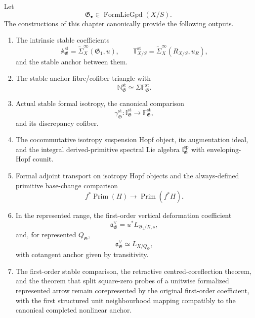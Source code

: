 \begin{theorem}
\label{thm:bnla-differentiation-package}
Let
\[
    \mathfrak G_\bullet
    \in
    \operatorname{FormLieGpd}(X/S).
\]
The constructions of this chapter canonically provide the following outputs.
\begin{enumerate}
    \item The intrinsic stable coefficients
    \[
        \mathbb A^{\mathrm{st}}_{\mathfrak G}
        =\widetilde\Sigma^\infty_X(\mathfrak G_1,u),
        \qquad
        \mathbb T^{\mathrm{st}}_{X/S}
        =\widetilde\Sigma^\infty_X(R_{X/S},u_R),
    \]
    and the stable anchor between them.

    \item The stable anchor fibre/cofiber triangle with
    \[
        \mathbb N^{\mathrm{st}}_{\mathfrak G}
        \simeq
        \Sigma\mathbb F^{\mathrm{st}}_{\mathfrak G}.
    \]

    \item Actual stable formal isotropy, the canonical comparison
    \[
        \gamma^{\mathrm{st}}_{\mathfrak G}:
        \mathbb I^{\mathrm{st}}_{\mathfrak G}
        \longrightarrow
        \mathbb F^{\mathrm{st}}_{\mathfrak G},
    \]
    and its discrepancy cofiber.

    \item The cocommutative isotropy suspension Hopf object, its augmentation
    ideal, and the integral derived-primitive spectral Lie algebra
    $\mathfrak l^{\mathrm{sp}}_{\mathfrak G}$ with enveloping-Hopf counit.

    \item Formal adjoint transport on isotropy Hopf objects and the
    always-defined primitive base-change comparison
    \[
        f^*\operatorname{Prim}(H)
        \longrightarrow
        \operatorname{Prim}(f^*H).
    \]

    \item In the represented range, the first-order vertical deformation
    coefficient
    \[
        \mathfrak a^\vee_{\mathfrak G}
        =u^*L_{\mathfrak G_1/X,s},
    \]
    and, for represented $Q_{\mathfrak G}$,
    \[
        \mathfrak a^\vee_{\mathfrak G}
        \simeq L_{X/Q_{\mathfrak G}},
    \]
    with cotangent anchor given by transitivity.

    \item The first-order stable comparison, the retractive centred-coreflection
    theorem, and the theorem that split square-zero probes of a unitwise
    formalized represented arrow remain corepresented by the original
    first-order coefficient, with the first structured unit neighbourhood
    mapping compatibly to the canonical completed nonlinear anchor.


\end{enumerate}
\end{theorem}
